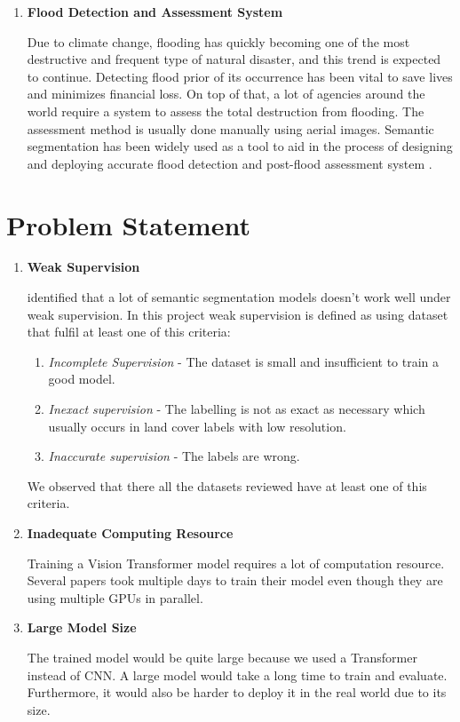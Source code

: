 \begin{enumerate}
    \item \textbf{Flood Detection and Assessment System}
    
    Due to climate change, flooding has quickly becoming one of the most destructive and frequent type of natural disaster, and this trend is expected to continue. Detecting flood prior of its occurrence has been vital to save lives and minimizes financial loss. On top of that, a lot of agencies around the world require a system to assess the total  destruction from flooding. The assessment method is usually done manually using aerial images. Semantic segmentation has been widely used as a tool to aid in the process of designing and deploying accurate flood detection and post-flood assessment system \cite{edseee.988427220220717}. 
\end{enumerate}

\section{Problem Statement}

\begin{enumerate}
    \item \textbf{Weak Supervision}
        
        \cite{weakly-supervised-semantic} identified that a lot of semantic segmentation models doesn't work well under weak supervision. In this project weak supervision is defined as using dataset that fulfil at least one of this criteria:
\begin{enumerate}
    \item \textit{Incomplete Supervision} - The dataset is small and insufficient to train a good model.
    \item \textit{Inexact supervision} - The labelling is not as exact as necessary which usually occurs in land cover labels with low resolution.
    \item \textit{Inaccurate supervision} - The labels are wrong.
\end{enumerate}
    We observed that there all the datasets reviewed have at least one of this criteria.
\item \textbf{Inadequate Computing Resource}
    
    Training a Vision Transformer model requires a lot of computation resource. Several papers took multiple days to train their model even though they are using multiple GPUs in parallel. 

\item \textbf{Large Model Size}

    The trained model would be quite large because we used a Transformer instead of CNN. A large model would take a long time to train and evaluate. Furthermore, it would also be harder to deploy it in the real world due to its size.

\end{enumerate}


